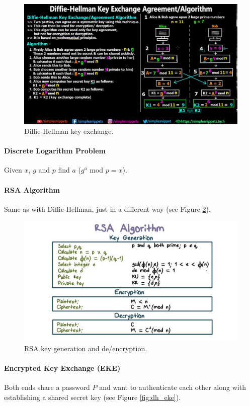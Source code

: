 \begin{figure}[h]
	\centering
	\includegraphics[scale=0.2]{images/1-diffie_hellman.jpg}
	\caption{Diffie-Hellman key exchange.}
	\label{fig:dhke}
\end{figure}

\paragraph{Discrete Logarithm Problem}
Given $x$, $g$ and $p$ find $a$ ($g^a$ mod $p = x$).

\paragraph{RSA Algorithm} Same as with Diffie-Hellman, just in a different way (see Figure \ref{fig:rsa}).

\begin{figure}[h]
	\centering
	\includegraphics[scale=0.2]{images/1-rsa.jpg}
	\caption{RSA key generation and de/encryption.}
	\label{fig:rsa}
\end{figure}

\paragraph{Encrypted Key Exchange (EKE)}
Both ends share a password $P$ and want to authenticate each other along with establishing a shared secret key (see Figure \ref{fig:dh_eke}).

